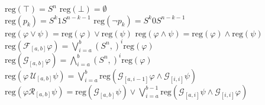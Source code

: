 \documentclass[runningheads]{llncs}
\renewcommand{\phi}{\varphi}
\begin{document}
     $\text{reg}(\top) = S^n$ \hfill 
     $\text{reg}(\bot) = \emptyset$ \\
     $\text{reg}(p_k) = S^{k}1S^{n-k-1}$ \hfill
     $\text{reg}(\neg p_k) = S^{k}0S^{n-k-1}$ \\
     $\text{reg}(\phi \lor \psi) =  \text{reg}(\phi) \lor \text{reg}(\psi)$\hfill
     $\text{reg}(\phi \land \psi) = \text{reg}(\phi) \land \text{reg}(\psi)$ \\
     $\text{reg}(\mathcal{F}_{[a,b]} \phi) = \bigvee_{i=a}^{b} (S^n,)^i \text{reg}(\phi)$ \hfill
     $\text{reg}(\mathcal{G}_{[a,b]} \phi) = \bigwedge_{i=a}^{b} (S^n,)^i \text{reg}(\phi)$\\
     $\text{reg}(\phi \ \mathcal{U}_{[a,b]} \psi) =  \bigvee_{i=a}^{b} \text{reg}\left(\mathcal{G}_{[a,i-1]}\phi \land \mathcal{G}_{[i, i]} \psi\right)$ \\
     $\text{reg}(\phi \mathcal{R}_{[a,b]} \psi) =  \text{reg}\left(\mathcal{G}_{[a,b]}\psi\right) \lor \bigvee_{i=a}^{b-1} \text{reg}\left(\mathcal{G}_{[a,i]}\psi \land \mathcal{G}_{[i, i]} \phi\right)$ %
     
\end{document}
